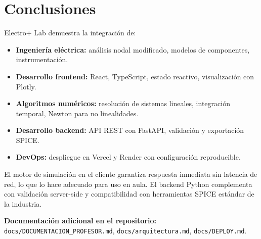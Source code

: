 \documentclass[12pt,a4paper]{article}
\begin{document}
\section{Conclusiones}

Electro+ Lab demuestra la integración de:

\begin{itemize}
  \item \textbf{Ingeniería eléctrica:} análisis nodal modificado, modelos de componentes, instrumentación.
  \item \textbf{Desarrollo frontend:} React, TypeScript, estado reactivo, visualización con Plotly.
  \item \textbf{Algoritmos numéricos:} resolución de sistemas lineales, integración temporal, Newton para no linealidades.
  \item \textbf{Desarrollo backend:} API REST con FastAPI, validación y exportación SPICE.
  \item \textbf{DevOps:} despliegue en Vercel y Render con configuración reproducible.
\end{itemize}

El motor de simulación en el cliente garantiza respuesta inmediata sin latencia de red, lo que lo hace adecuado para uso en aula. El backend Python complementa con validación server-side y compatibilidad con herramientas SPICE estándar de la industria.

\vspace{1em}
\noindent\textbf{Documentación adicional en el repositorio:}
\texttt{docs/DOCUMENTACION\_PROFESOR.md},
\texttt{docs/arquitectura.md},
\texttt{docs/DEPLOY.md}.
\end{document}
